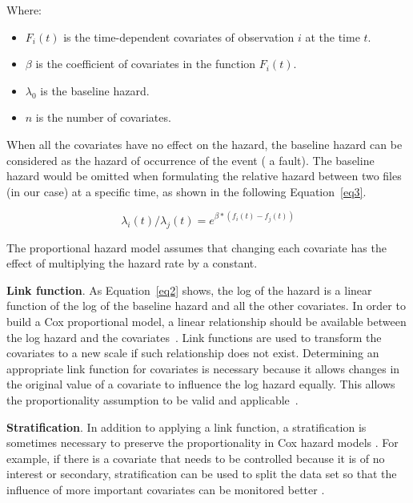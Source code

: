 Where:
\begin{itemize}
	\item ${F_{i}}(t)$ is the time-dependent covariates of observation $i$ at the time $t$.
	\item $\beta$ is the coefficient of covariates in the function ${F_{i}}(t)$.	
	\item $\lambda_0$ is the baseline hazard.
	\item $n$ is the number of covariates.
\end{itemize}

When all the covariates have no effect on the hazard, the baseline hazard can be considered as the hazard of occurrence of the event (\ie{} a fault). The baseline hazard would be omitted when formulating the relative hazard between two files (in our case) at a specific time, as shown in the following Equation~\ref{eq3}.

\begin{equation}\label{eq3}
\lambda_{i}(t) \slash \lambda_{j}(t) = e ^ {\beta*{(f_{i}(t) - f_{j}(t))}}
\end{equation}

The proportional hazard model assumes that changing each covariate has the effect of multiplying the hazard rate by a constant.


\textbf{Link function}. As Equation~\ref{eq2} shows, the log of the hazard is a linear function of the log of the baseline hazard and all the other covariates. In order to build a Cox proportional model, a linear relationship should be available between the log hazard and the covariates~\cite{therneau2000modeling}. Link functions are used to transform the covariates to a new scale if such relationship does not exist. Determining an appropriate link function for covariates is necessary because it allows changes in the original value of a covariate to influence the log hazard equally. This allows the proportionality assumption to be valid and applicable~\cite{therneau2000modeling}.

\textbf{Stratification}. In addition to applying a link function, a stratification is sometimes necessary to preserve the proportionality in Cox hazard models \cite{koru2008theory}. For example, if there is a covariate that needs to be controlled because it is of no interest or secondary, stratification can be used to split the data set so that the influence of more important covariates can be monitored better \cite{koru2008theory}.

